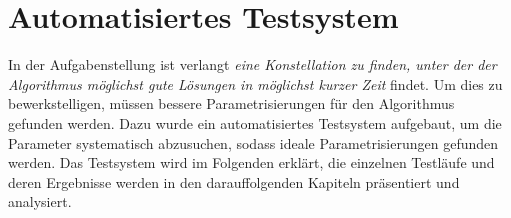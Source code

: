 \section{Automatisiertes Testsystem}\label{testsystem}

In der Aufgabenstellung \cite{aufg} ist verlangt \emph{eine Konstellation zu finden,
unter der der Algorithmus möglichst gute Lösungen in möglichst kurzer Zeit} findet.
Um dies zu bewerkstelligen, müssen bessere Parametrisierungen für den Algorithmus
gefunden werden. Dazu wurde ein automatisiertes Testsystem aufgebaut, um
die Parameter systematisch abzusuchen, sodass ideale Parametrisierungen
gefunden werden. Das Testsystem wird im Folgenden erklärt, die einzelnen Testläufe
und deren Ergebnisse werden in den darauffolgenden Kapiteln präsentiert und
analysiert.

